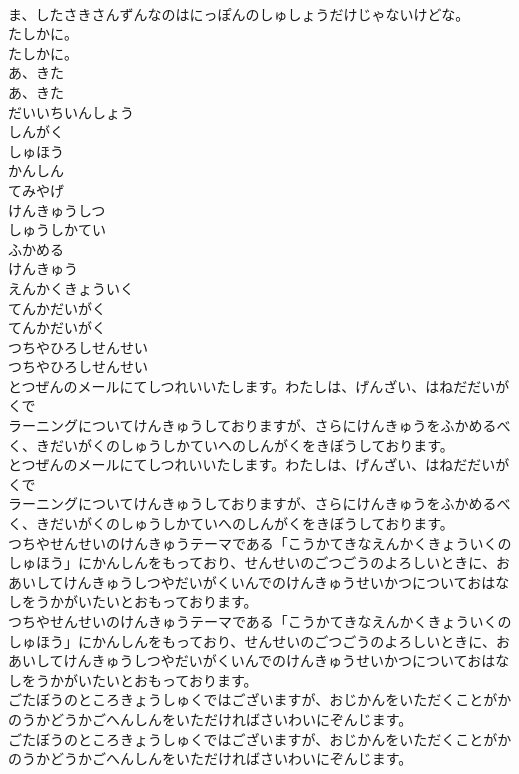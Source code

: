\documentclass[8pt]{extreport}
\begin{document}
\begin{CJK}{UTF8}{min}
\\	ま、したさきさんずんなのはにっぽんのしゅしょうだけじゃないけどな。
\\	たしかに。
\\	たしかに。
\\	あ、きた
\\	あ、きた
\\	だいいちいんしょう
\\	しんがく
\\	しゅほう
\\	かんしん
\\	てみやげ
\\	けんきゅうしつ
\\	しゅうしかてい
\\	ふかめる
\\	けんきゅう
\\	えんかくきょういく
\\	てんかだいがく
\\	てんかだいがく
\\	つちやひろしせんせい
\\	つちやひろしせんせい
\\	とつぜんのメールにてしつれいいたします。わたしは、げんざい、はねだだいがくで
\\	ラーニングについてけんきゅうしておりますが、さらにけんきゅうをふかめるべく、きだいがくのしゅうしかていへのしんがくをきぼうしております。
\\	とつぜんのメールにてしつれいいたします。わたしは、げんざい、はねだだいがくで
\\	ラーニングについてけんきゅうしておりますが、さらにけんきゅうをふかめるべく、きだいがくのしゅうしかていへのしんがくをきぼうしております。
\\	つちやせんせいのけんきゅうテーマである「こうかてきなえんかくきょういくのしゅほう」にかんしんをもっており、せんせいのごつごうのよろしいときに、おあいしてけんきゅうしつやだいがくいんでのけんきゅうせいかつについておはなしをうかがいたいとおもっております。
\\	つちやせんせいのけんきゅうテーマである「こうかてきなえんかくきょういくのしゅほう」にかんしんをもっており、せんせいのごつごうのよろしいときに、おあいしてけんきゅうしつやだいがくいんでのけんきゅうせいかつについておはなしをうかがいたいとおもっております。
\\	ごたぼうのところきょうしゅくではございますが、おじかんをいただくことがかのうかどうかごへんしんをいただければさいわいにぞんじます。
\\	ごたぼうのところきょうしゅくではございますが、おじかんをいただくことがかのうかどうかごへんしんをいただければさいわいにぞんじます。

\end{CJK}
\end{document}

